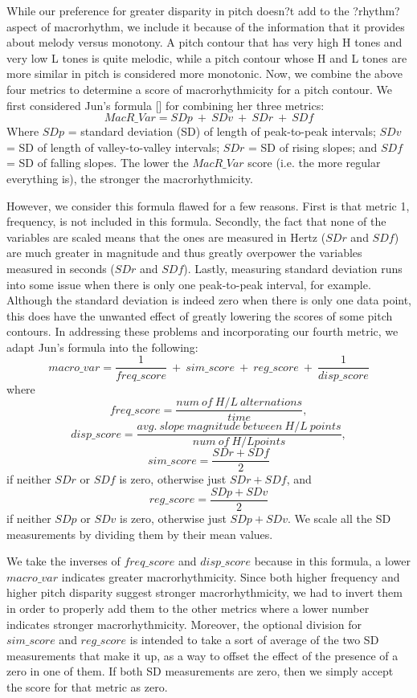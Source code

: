 \documentclass[pageno]{jpaper}
\begin{document}
While our preference for greater disparity in pitch doesn?t add to the ?rhythm? aspect of macrorhythm, we include it because of the information that it provides about melody versus monotony. A pitch contour that has very high H tones and very low L tones is quite melodic, while a pitch contour whose H and L tones are more similar in pitch is considered more monotonic. 
Now, we combine the above four metrics to determine a score of macrorhythmicity for a pitch contour. We first considered Jun's formula [] for combining her three metrics:
\[
MacR\_Var = SDp \ +\  SDv  \ +\  SDr \ +\ SDf
\]
Where $SDp$ = standard deviation (SD) of length of peak-to-peak intervals; $SDv$ = SD of length of valley-to-valley intervals; $SDr$ = SD of rising slopes; and $SDf$ = SD of falling slopes. The lower the $MacR\_Var$ score (i.e. the more regular everything is), the stronger the macrorhythmicity.

However, we consider this formula flawed for a few reasons. First is that metric 1, frequency, is not included in this formula. Secondly, the fact that none of the variables are scaled means that the ones are measured in Hertz ($SDr$ and $SDf$) are much greater in magnitude and thus greatly overpower the variables measured in seconds ($SDr$ and $SDf$). Lastly, measuring standard deviation runs into some issue when there is only one peak-to-peak interval, for example. Although the standard deviation is indeed zero when there is only one data point, this does have the unwanted effect of greatly lowering the scores of some pitch contours. 
In addressing these problems and incorporating our fourth metric, we adapt Jun's formula into the following:
\[
macro\_var = \frac{1}{freq\_score}  \ + \ sim\_score \ + \ reg\_score \ + \ \frac{1}{disp\_score}
\]
where
\[
freq\_score = \frac{num \ of \ H/L \ alternations}{time},
\]
\[
disp\_score = \frac{avg. \ slope \ magnitude \ between \ H/L \ points}{num \ of \ H/L points},
\]
\[
sim\_score = \frac{SDr + SDf}{ 2}
\]
if neither $SDr$ or $SDf$ is zero, otherwise just $SDr + SDf$, and
\[
reg\_score = \frac{SDp + SDv}{ 2}
\]
if neither $SDp$ or $SDv$ is zero, otherwise just $SDp + SDv$. We scale all the SD measurements by dividing them by their mean values.

We take the inverses of $freq\_score$ and $disp\_score$ because in this formula, a lower $macro\_var$ indicates greater macrorhythmicity. Since both higher frequency and higher pitch disparity suggest stronger macrorhythmicity, we had to invert them in order to properly add them to the other metrics where a lower number indicates stronger macrorhythmicity. Moreover, the optional division for $sim\_score$ and $reg\_score$ is intended to take a sort of average of the two SD measurements that make it up, as a way to offset the effect of the presence of a zero in one of them. If both SD measurements are zero, then we simply accept the score for that metric as zero. 
\end{document}
